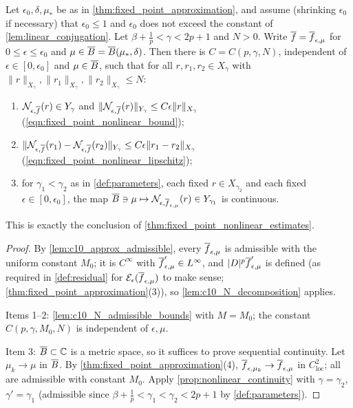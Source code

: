 \begin{lemma}
  \label{lem:nonlinear_assembly}
  Let $\epsilon_0,\delta,\mu_*$ be as in \cref{thm:fixed_point_approximation}, and assume (shrinking
  $\epsilon_0$ if necessary) that $\epsilon_0\le1$ and $\epsilon_0$ does not exceed the constant of
  \cref{lem:linear_conjugation}. Let $\beta+\frac1p<\gamma<2p+1$ and $N>0$. Write
  $\overline{f}=\overline{f}_{\epsilon,\mu}$ for $0\le\epsilon\le\epsilon_0$ and $\mu\in\overline{B}=\overline{B}(\mu_*,\delta)$. Then there is
  $C=C(p,\gamma,N)$, independent of $\epsilon\in[0,\epsilon_0]$ and $\mu\in\overline{B}$, such that for all
  $r,r_1,r_2\in X_\gamma$ with $\|r\|_{X_\gamma},\|r_1\|_{X_\gamma},\|r_2\|_{X_\gamma}\le N$:
  \begin{enumerate}
    \item $\mathcal{N}_{\epsilon,\overline{f}}(r)\in Y_\gamma$ and $\|\mathcal{N}_{\epsilon,\overline{f}}(r)\|_{Y_\gamma}\le C\epsilon\|r\|_{X_\gamma}$
      (\eqref{eqn:fixed_point_nonlinear_bound});
    \item $\|\mathcal{N}_{\epsilon,\overline{f}}(r_1)-\mathcal{N}_{\epsilon,\overline{f}}(r_2)\|_{Y_\gamma}\le C\epsilon\|r_1-r_2\|_{X_\gamma}$
      (\eqref{eqn:fixed_point_nonlinear_lipschitz});
    \item for $\gamma_1<\gamma_2$ as in \cref{def:parameters}, each fixed $r\in X_{\gamma_2}$ and each fixed
      $\epsilon\in[0,\epsilon_0]$, the map $\overline{B}\ni\mu\mapsto\mathcal{N}_{\epsilon,\overline{f}_{\epsilon,\mu}}(r)\in Y_{\gamma_1}$ is continuous.
  \end{enumerate}
  This is exactly the conclusion of \cref{thm:fixed_point_nonlinear_estimates}.
\end{lemma}
\begin{proof}
  By \cref{lem:c10_approx_admissible}, every $\overline{f}_{\epsilon,\mu}$ is admissible with the uniform constant $M_0$;
  it is $C^\infty$ with $\overline{f}'_{\epsilon,\mu}\in L^\infty$, and $|D|^p\overline{f}'_{\epsilon,\mu}$ is defined (as required in
  \cref{def:residual} for $\mathcal{E}_\epsilon(\overline{f}_{\epsilon,\mu})$ to make sense; \cref{thm:fixed_point_approximation}(3)), so
  \cref{lem:c10_N_decomposition} applies.

  Items 1--2: \cref{lem:c10_N_admissible_bounds} with $M=M_0$; the constant $C(p,\gamma,M_0,N)$ is independent of
  $\epsilon,\mu$.

  Item 3: $\overline{B}\subset\mathbb{C}$ is a metric space, so it suffices to prove sequential continuity. Let $\mu_k\to\mu$ in
  $\overline{B}$. By \cref{thm:fixed_point_approximation}(4), $\overline{f}_{\epsilon,\mu_k}\to\overline{f}_{\epsilon,\mu}$ in
  $C^2_{\mathrm{loc}}$; all are admissible with constant $M_0$. Apply \cref{prop:nonlinear_continuity} with
  $\gamma=\gamma_2$, $\gamma'=\gamma_1$ (admissible since $\beta+\frac1p<\gamma_1<\gamma_2<2p+1$ by
  \cref{def:parameters}).
\end{proof}
